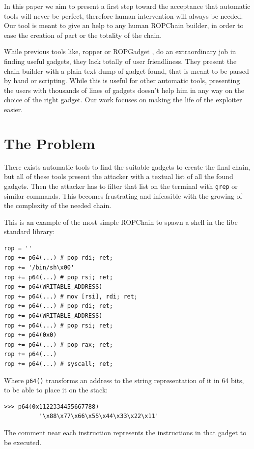 \documentclass[twocolumn, 11pt]{article}
\begin{document}
In this paper we aim to present a first step toward the acceptance that automatic tools will never be perfect, therefore human intervention will always be needed. Our tool is meant to give an help to any human ROPChain builder, in order to ease the creation of part or the totality of the chain.

While previous tools like, ropper \cite{ropper} or ROPGadget \cite{ROPGadget}, do an extraordinary job in finding useful gadgets, they lack totally of user friendliness. They present the chain builder with a plain text dump of gadget found, that is meant to be parsed by hand or scripting. While this is useful for other automatic tools, presenting the users with thousands of lines of gadgets doesn't help him in any way on the choice of the right gadget. Our work focuses on making the life of the exploiter easier.

\section{The Problem}
There exists automatic tools to find the suitable gadgets to create the final chain, but all of these tools present the attacker with a textual list of all the found gadgets. Then the attacker has to filter that list on the terminal with \texttt{grep} or similar commands. This becomes frustrating and infeasible with the growing of the complexity of the needed chain.

This is an example of the most simple ROPChain to spawn a shell in the libc standard library:

\begin{lstlisting}
rop = ''
rop += p64(...) # pop rdi; ret;
rop += '/bin/sh\x00'
rop += p64(...) # pop rsi; ret;
rop += p64(WRITABLE_ADDRESS)
rop += p64(...) # mov [rsi], rdi; ret;
rop += p64(...) # pop rdi; ret;
rop += p64(WRITABLE_ADDRESS)
rop += p64(...) # pop rsi; ret;
rop += p64(0x0)
rop += p64(...) # pop rax; ret;
rop += p64(...)
rop += p64(...) # syscall; ret;
\end{lstlisting}

\bigskip
Where \texttt{p64()} transforms an address to the string representation of it in 64 bits, to be able to place it on the stack:
\begin{lstlisting}
>>> p64(0x1122334455667788)
          '\x88\x77\x66\x55\x44\x33\x22\x11'
\end{lstlisting}

The comment near each instruction represents the instructions in that gadget to be executed.
\end{document}
